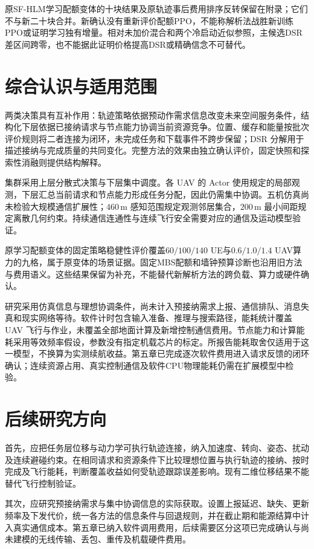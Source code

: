 原SF-HLM学习配额变体的十块结果及原轨迹事后费用排序反转保留在附录；它们不与新二十块合并。新确认没有重新评价配额PPO，不能称解析法战胜新训练PPO或证明学习独有增量。相对未加价混合和两个冷启动近似参照，主候选DSR差区间跨零，也不能据此证明价格提高DSR或精确信念不可替代。

\section{综合认识与适用范围}
\label{sec:ch6-interpretation}

两类决策具有互补作用：轨迹策略依据预动作需求信息改变未来空间服务条件，结构化下层依据已接纳请求与节点能力协调当前资源竞争。位置、缓存和能量按批次评价规则将二者连接为闭环，未完成任务和下载事件不跨步保留；DSR 分解用于描述接纳与完成质量的共同变化。完整方法的效果由独立确认评价，固定快照和探索性消融则提供结构解释。

集群采用上层分散式决策与下层集中调度。各 UAV 的 Actor 使用规定的局部观测，下层汇总当前请求和节点能力形成任务分配，因此仍需集中协调。五机仿真尚未检验大规模通信扩展性；$460\,\mathrm{m}$ 感知范围规定观测邻居集合，$200\,\mathrm{m}$ 最小间距规定离散几何约束。持续通信连通性与连续飞行安全需要对应的通信及运动模型验证。

原学习配额变体的固定策略稳健性评价覆盖$60/100/140$ UE与$0.6/1.0/1.4$ UAV算力的九格，属于原变体的场景证据。固定MBS配额和墙钟预算诊断也沿用旧方法与费用语义。这些结果保留为补充，不能替代新解析方法的跨负载、算力或硬件确认。

研究采用仿真信息与理想协调条件，尚未计入预接纳需求上报、通信排队、消息失真和现实网络等待。软件计时包含输入准备、推理与搜索路径，能耗统计覆盖 UAV 飞行与作业，未覆盖全部地面计算及新增控制通信费用。节点能力和计算能耗采用等效频率假设，参数没有指定机载芯片的标定。所报告能耗取舍仅适用于这一模型，不换算为实测续航收益。第五章已完成逐次软件费用进入请求反馈的闭环确认；连续资源占用、真实控制通信及软件CPU物理能耗仍需在扩展模型中检验。

\section{后续研究方向}
\label{sec:ch6-future}

首先，应把任务层位移与动力学可执行轨迹连接，纳入加速度、转向、姿态、扰动及连续避碰约束。在相同请求和资源条件下比较理想位置与执行轨迹的接纳、按时完成及飞行能耗，判断覆盖收益如何受轨迹跟踪误差影响。现有二维位移结果不能替代飞行控制验证。

其次，应研究预接纳需求与集中协调信息的实际获取。设置上报延迟、缺失、更新频率及下发代价，统一各方法的信息条件与回退规则，并在截止期和能源结算中计入真实通信成本。第五章已纳入软件调用费用，后续需要区分这项已完成确认与尚未建模的无线传输、丢包、重传及机载硬件费用。

